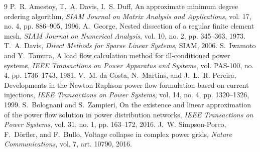 {\begin{thebibliography}{9}
 P.~R. Amestoy, T.~A. Davis, I.~S. Duff, An approximate
minimum degree ordering algorithm, \emph{SIAM Journal on Matrix Analysis and
Applications}, vol. 17, no. 4, pp. 886--905, 1996.
 A.~George, Nested dissection of a regular finite
element mesh, \emph{SIAM Journal on Numerical Analysis}, vol. 10, no. 2,
pp. 345--363, 1973.
 T.~A. Davis, \emph{Direct Methods for Sparse
Linear Systems}, SIAM, 2006.
 S.~Iwamoto and Y.~Tamura, A load flow calculation method
for ill-conditioned power systems, \emph{IEEE Transactions on Power Apparatus
and Systems}, vol. PAS-100, no. 4, pp. 1736--1743, 1981.
 V.~M. da Costa, N.~Martins, and J.~L.~R. Pereira,
Developments in the Newton Raphson power flow formulation based on current
injections, \emph{IEEE Transactions on Power Systems}, vol. 14, no. 4,
pp. 1320--1326, 1999.
 S.~Bolognani and S.~Zampieri, On the existence and linear
approximation of the power flow solution in power distribution networks,
\emph{IEEE Transactions on Power Systems}, vol. 31, no. 1, pp. 163--172, 2016.
 J.~W. Simpson-Porco, F.~D\"orfler, and F.~Bullo,
Voltage collapse in complex power grids, \emph{Nature Communications}, vol. 7,
art. 10790, 2016.
\end{thebibliography}}
